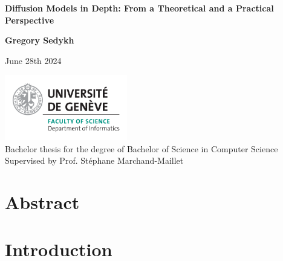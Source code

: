 \documentclass{article}
\begin{document}
\begin{titlepage}
  \begin{center}
      \vspace*{1cm}

      \LARGE
      \textbf{Diffusion Models in Depth: From a Theoretical and a Practical Perspective}

      \vspace{1.5cm}

      \Large
      \textbf{Gregory Sedykh}
      \vspace{0.8cm}

      \normalsize
      June 28th 2024

      \vfill

      \includegraphics[width=0.4\textwidth]{images/informatics_en.png} \\

      Bachelor thesis for the degree of Bachelor of Science in Computer Science \\
      Supervised by Prof. Stéphane Marchand-Maillet     

      \vspace{0.8cm}
    
           
           
  \end{center}
\end{titlepage}


\newpage
\section*{Abstract}

\newpage
\tableofcontents



\newpage
\section{Introduction}
\end{document}

